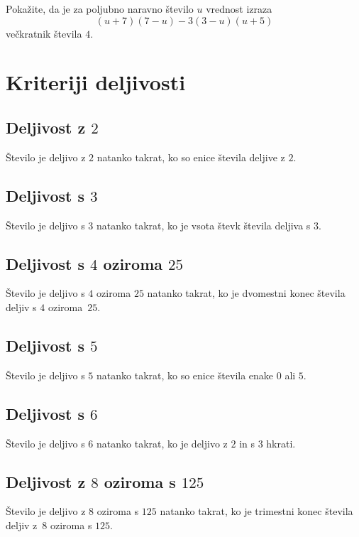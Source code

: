     
        \begin{naloga}
            Pokažite, da je za poljubno naravno število $u$ vrednost izraza $$(u+7)(7-u)-3(3-u)(u+5)$$ večkratnik števila $4$.
        \end{naloga}        

\newpage
    \section{Kriteriji deljivosti}
    
        \subsection*{Deljivost z $2$}
            Število je deljivo z $2$ natanko takrat, ko so enice števila deljive z $2$.

        \subsection*{Deljivost s $3$}
            Število je deljivo s $3$ natanko takrat, ko je vsota števk števila deljiva s $3$.

        \subsection*{Deljivost s $4$ oziroma $25$}
            Število je deljivo s $4$ oziroma $25$ natanko takrat, ko je dvomestni konec števila deljiv s $4$ oziroma~$25$.

        \subsection*{Deljivost s $5$}
            Število je deljivo s $5$ natanko takrat, ko so enice števila enake $0$ ali $5$.
    
        \subsection*{Deljivost s $6$}
            Število je deljivo s $6$ natanko takrat, ko je deljivo z $2$ in s $3$ hkrati.

        \subsection*{Deljivost z $8$ oziroma s $125$}
            Število je deljivo z $8$ oziroma s $125$ natanko takrat, ko je trimestni konec števila deljiv z~$8$ oziroma s $125$.

